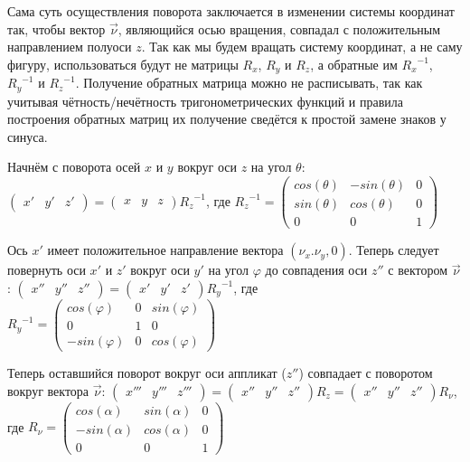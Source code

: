 \documentclass [12pt, a4paper] {article}
\begin{document}
Сама суть осуществления поворота заключается в изменении системы координат так, чтобы вектор $\overrightarrow{\nu}$, являющийся осью вращения, совпадал с положительным направлением полуоси $z$. Так как мы будем вращать систему координат, а не саму фигуру, использоваться будут не матрицы $R_x$, $R_y$ и $R_z$, а обратные им ${R_x}^{-1}$, ${R_y}^{-1}$ и ${R_z}^{-1}$. Получение обратных матрица можно не расписывать, так как учитывая чётность/нечётность тригонометрических функций и правила построения обратных матриц их получение сведётся к простой замене знаков у синуса.

Начнём с поворота осей $x$ и $y$ вокруг оси $z$ на угол $\theta$:
$\begin {pmatrix} x' & y' & z' \end {pmatrix} = \begin {pmatrix} x & y & z \end {pmatrix} {R_z}^{-1}$, где ${R_z}^{-1} = \begin {pmatrix}
	cos(\theta) & -sin(\theta) & 0 \\
	sin(\theta) & cos(\theta) & 0 \\
	0 & 0 & 1
\end {pmatrix}$


Ось $x'$ имеет положительное направление вектора $(\nu_x. \nu_y, 0)$. Теперь следует повернуть оси $x'$ и $z'$ вокруг оси $y'$ на угол $\varphi$ до совпадения оси $z''$ с вектором $\overrightarrow{\nu}$:
$\begin {pmatrix} x'' & y'' & z'' \end {pmatrix} = \begin {pmatrix} x' & y' & z' \end {pmatrix} {R_y}^{-1}$, где ${R_y}^{-1} = \begin {pmatrix}
	cos(\varphi) & 0 & sin(\varphi) \\
	0 & 1 & 0 \\
	-sin(\varphi) & 0 & cos(\varphi)
\end {pmatrix}$


Теперь оставшийся поворот вокруг оси аппликат ($z''$) совпадает с поворотом вокруг вектора $\overrightarrow{\nu}$:
$\begin {pmatrix} x''' & y''' & z''' \end {pmatrix} = \begin {pmatrix} x'' & y'' & z'' \end {pmatrix} R_z = \begin {pmatrix} x'' & y'' & z'' \end {pmatrix} R_\nu$, где $R_\nu = \begin {pmatrix}
	cos(\alpha) & sin(\alpha) & 0 \\
	-sin(\alpha) & cos(\alpha) & 0 \\
	0 & 0 & 1
\end {pmatrix}$
\end{document}
